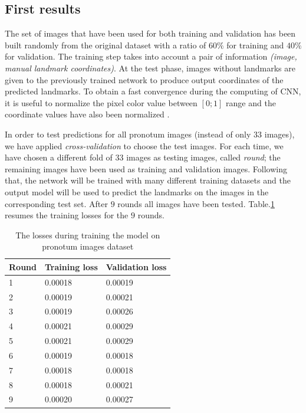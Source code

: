 \documentclass[10pt]{article}
\begin{document}
\subsection{First results}
\label{sectrain1}
The set of images that have been used for both training and validation
has been built randomly from the original dataset with a ratio of
$60\%$ for training and $40\%$ for  validation. The training step
takes into account a pair of information \textit{(image, manual
  landmark coordinates)}. At the test phase, images without landmarks
are given to the previously trained network to produce output
coordinates of the predicted landmarks. To obtain a fast convergence
during the computing of CNN, it is useful to normalize the pixel
color value between $[0; 1]$ range and the coordinate values have also been normalized  \cite{lecun2012efficient}.

In order to test predictions for all pronotum images (instead of only $33$ images),
we have applied \textit{cross-validation} to choose the test images. For each time,
we have chosen a different fold of $33$ images as testing images, called \textit{round};
the remaining images have been used as training and validation images. Following that, the network will be trained with many
different training datasets and the output model will be used to
predict the landmarks on the images in the corresponding test
set. After $9$ rounds all images have been
tested. Table.\ref{tbltrainingloss} resumes the training losses for
the $9$ rounds.

\begin{table}[h!]
	\centering
	\begin{tabular}{l l l}
	Round & Training loss & Validation loss \\ \hline
	1 & 0.00018 & 0.00019  \\ \hline
	2 & 0.00019 & 0.00021 \\ \hline
	3 & 0.00019 & 0.00026 \\ \hline
	4 & 0.00021 & 0.00029 \\ \hline
	5 & 0.00021 & 0.00029 \\ \hline
	6 & 0.00019 & 0.00018 \\ \hline
	7 & 0.00018 & 0.00018 \\ \hline
	8 & 0.00018 & 0.00021 \\ \hline
	9 & 0.00020 & 0.00027 \\ \hline
	\end{tabular}
	\caption{\small{The losses during training the model on pronotum images dataset}}
	\label{tbltrainingloss}
\end{table}
\end{document}
